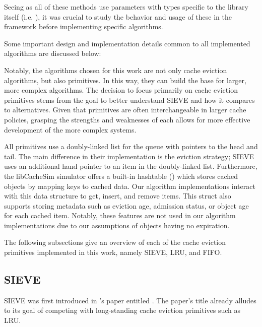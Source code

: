 Seeing as all of these methods use parameters with types specific to the library itself (i.e. ), it was crucial to study the behavior and usage of these in the framework before implementing specific algorithms.

Some important design and implementation details common to all implemented algorithms are discussed below:


\begin{description}[style=unboxed, leftmargin=0cm]
    \item[Primitives] Notably, the algorithms chosen for this work are not only cache eviction algorithms, but also primitives. In this way, they can build the base for larger, more complex algorithms. The decision to focus primarily on cache eviction primitives stems from the goal to better understand SIEVE and how it compares to alternatives. Given that primitives are often interchangeable in larger cache policies, grasping the strengths and weaknesses of each allows for more effective development of the more complex systems.
    \item[Data structures] All primitives use a doubly-linked list for the queue with pointers to the head and tail. The main difference in their implementation is the eviction strategy; SIEVE uses an additional hand pointer to an item in the doubly-linked list. Furthermore, the libCacheSim simulator offers a built-in hashtable () which stores cached objects by mapping keys to cached data. Our algorithm implementations interact with this data structure to get, insert, and remove items. This struct also supports storing metadata such as eviction age, admission status, or object age for each cached item. Notably, these features are not used in our algorithm implementations due to our assumptions of objects having no expiration.
\end{description}

The following subsections give an overview of each of the cache eviction primitives implemented in this work, namely SIEVE, LRU, and FIFO.

\subsection{SIEVE}

SIEVE was first introduced in \citeauthor{sieve}'s \citeyear{sieve} paper entitled \textit{} \cite{sieve}. The paper's title already alludes to its goal of competing with long-standing cache eviction primitives such as LRU.

